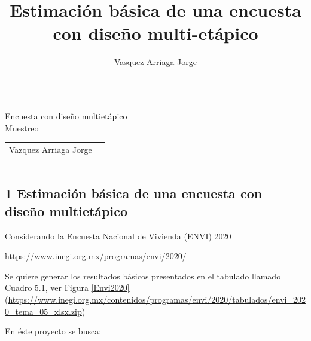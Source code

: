 \documentclass[
]{article}
\title{Estimación básica de una encuesta con diseño multi-etápico}
\author{Vasquez Arriaga Jorge}
\date{}
\begin{document}
\thispagestyle{plain}
\hrule
\begin{center}
	\vspace{0.2cm}
	\huge{Encuesta con diseño
		multietápico}\\
	
	\large{Muestreo}
\end{center}

\vspace{0.1cm}

\begin{table}[h]
	\centering
	\begin{tabular}{ll}
		Vazquez Arriaga Jorge 
	\end{tabular}
\end{table}

\hrule

\vspace{5mm}

\setlength{\parindent}{0cm}


\hypertarget{estimaciuxf3n-buxe1sica-de-una-encuesta-con-diseuxf1o-multietuxe1pico}{%
\subsection{1 Estimación básica de una encuesta con diseño
multietápico}\label{estimaciuxf3n-buxe1sica-de-una-encuesta-con-diseuxf1o-multietuxe1pico}}

Considerando la Encuesta Nacional de Vivienda (ENVI) 2020

\url{https://www.inegi.org.mx/programas/envi/2020/}

Se quiere generar los resultados básicos
presentados en el tabulado llamado Cuadro 5.1, ver Figura \ref{Envi2020}
(\url{https://www.inegi.org.mx/contenidos/programas/envi/2020/tabulados/envi_2020_tema_05_xlsx.zip})

En éste proyecto se busca:
\end{document}
